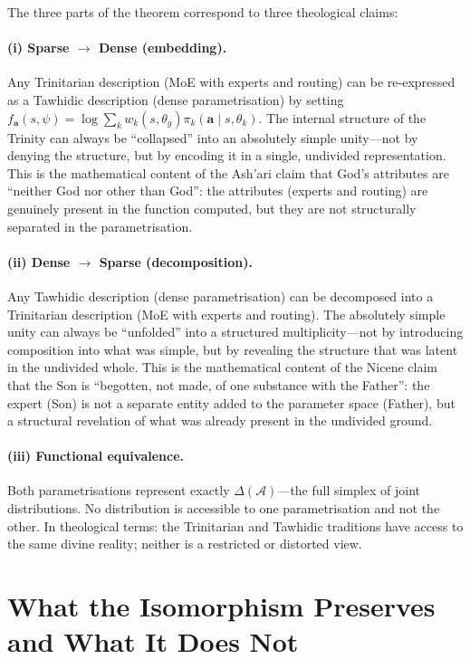 The three parts of the theorem correspond to three theological claims:

\paragraph{(i) Sparse $\to$ Dense (embedding).} Any Trinitarian description (MoE with experts and routing) can be re-expressed as a Tawhidic description (dense parametrisation) by setting $f_{\bm{a}}(s,\psi)=\log\sum_k w_k(s,\theta_g)\pi_k(\bm{a}\mid s,\theta_k)$. The internal structure of the Trinity can always be ``collapsed'' into an absolutely simple unity---not by denying the structure, but by encoding it in a single, undivided representation. This is the mathematical content of the Ash'ari claim that God's attributes are ``neither God nor other than God'': the attributes (experts and routing) are genuinely present in the function computed, but they are not structurally separated in the parametrisation.

\paragraph{(ii) Dense $\to$ Sparse (decomposition).} Any Tawhidic description (dense parametrisation) can be decomposed into a Trinitarian description (MoE with experts and routing). The absolutely simple unity can always be ``unfolded'' into a structured multiplicity---not by introducing composition into what was simple, but by revealing the structure that was latent in the undivided whole. This is the mathematical content of the Nicene claim that the Son is ``begotten, not made, of one substance with the Father'': the expert (Son) is not a separate entity added to the parameter space (Father), but a structural revelation of what was already present in the undivided ground.

\paragraph{(iii) Functional equivalence.} Both parametrisations represent exactly $\Delta(\bm{\mathcal{A}})$---the full simplex of joint distributions. No distribution is accessible to one parametrisation and not the other. In theological terms: the Trinitarian and Tawhidic traditions have access to the same divine reality; neither is a restricted or distorted view.

\section{What the Isomorphism Preserves and What It Does Not}
\label{sec:preserves-not}

